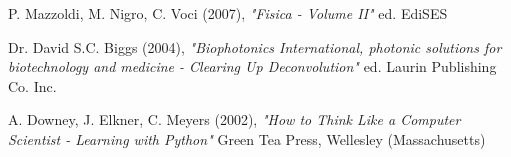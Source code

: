 \begin{thebibliography}{3}
 P. Mazzoldi, M. Nigro, C. Voci (2007), \emph{"Fisica - Volume II"} \newline ed. EdiSES

 Dr. David S.C. Biggs (2004), \emph{"Biophotonics International, photonic solutions for biotechnology and medicine - Clearing Up Deconvolution"} \newline ed. Laurin Publishing Co. Inc.

 A. Downey, J. Elkner, C. Meyers (2002), \emph{"How to Think Like a Computer Scientist - Learning with Python"} \newline Green Tea Press, Wellesley (Massachusetts)

\end{thebibliography} 